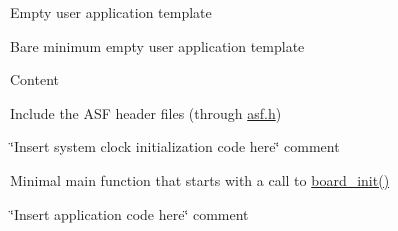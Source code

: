 \begin{DoxyParagraph}{Empty user application template}

\end{DoxyParagraph}
Bare minimum empty user application template

\begin{DoxyParagraph}{Content}

\end{DoxyParagraph}

\begin{DoxyEnumerate}
\item Include the ASF header files (through \mbox{\hyperlink{asf_8h}{asf.\+h}})
\item \char`\"{}\+Insert system clock initialization code here\char`\"{} comment
\item Minimal main function that starts with a call to \mbox{\hyperlink{group__group__common__boards_ga916f2adc2080b4fe88034086d107a8dc}{board\+\_\+init()}}
\item \char`\"{}\+Insert application code here\char`\"{} comment 
\end{DoxyEnumerate}